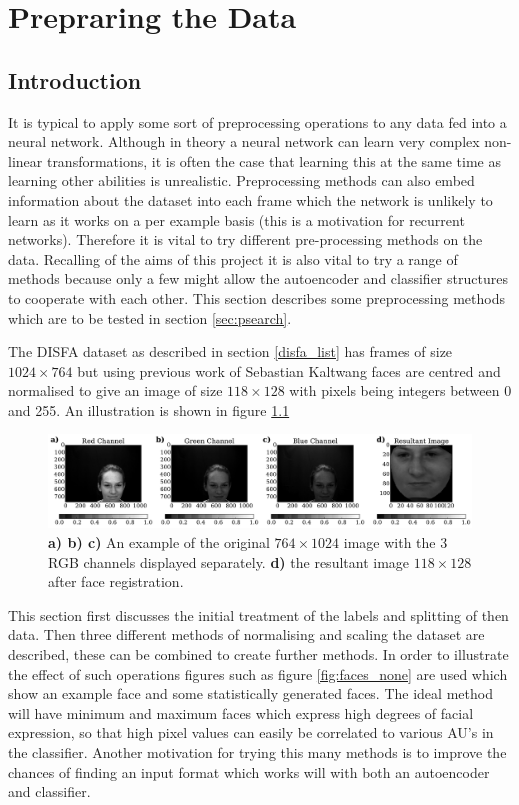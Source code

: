 \chapter{Prepraring the Data}
  \section{Introduction}
    It is typical to apply some sort of preprocessing operations to any data fed into
    a neural network. Although in theory a neural network can learn very complex
    non-linear transformations, it is often the case that learning this at the same
    time as learning other abilities is unrealistic. Preprocessing methods can
    also embed information about the dataset into each frame which the network is
    unlikely to learn as it works on a per example basis (this is a motivation for
    recurrent networks).
     Therefore it is vital to try
    different pre-processing methods on the data.
    Recalling of the aims of this project it is also vital to try a range of methods
    because only a few
    might allow the autoencoder and classifier structures to cooperate with each other.
    This section describes some preprocessing methods which are to be
    tested in section \ref{sec:psearch}.


    The DISFA dataset as described in section \ref{disfa_list} has frames of size $ 1024 \times 764 $
    but using previous work of Sebastian Kaltwang\cite{Kaltwang2015} faces are
    centred and normalised to give an image of size $118 \times 128$
    with pixels being integers between
    0 and 255. An illustration is shown in figure \ref{fig:sebproc}

    \begin{figure}[!h] \centering
    \includegraphics[width =\hsize]{figures/seb_preproc.pdf}
    \caption{ {\bf a) b) c)} An example of the original $764 \times 1024$ image with
    the 3 RGB channels displayed separately. {\bf d)} the resultant image
    $118 \times 128$ after face registration.} \label{fig:sebproc} \end{figure}


    This section first discusses the initial treatment of the labels and splitting of then data.
    Then three different methods of normalising and scaling
    the dataset are described, these can be combined to create further methods. In order to illustrate
    the effect of such operations figures such as figure \ref{fig:faces_none} are used which
    show an example face and some statistically generated faces. The ideal method will
    have minimum and maximum faces which express high degrees of facial expression, so that
    high pixel values can easily be correlated to various AU's in the classifier. Another motivation
    for trying this many methods is to improve the chances of finding an input format which works will with both an
    autoencoder and classifier.

